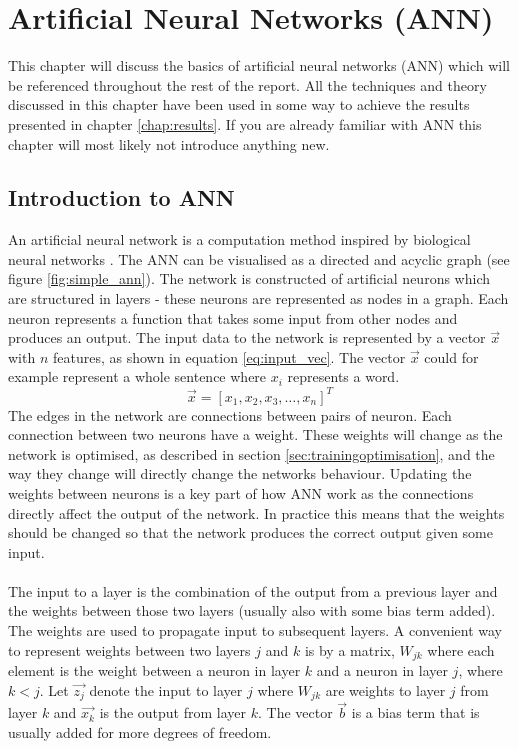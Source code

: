 \chapter{Artificial Neural Networks (ANN)}\label{chap:ann}
This chapter will discuss the basics of artificial neural networks (ANN) which will be referenced throughout the rest of the report. All the techniques and theory discussed in this chapter have been used in some way to achieve the results presented in chapter \ref{chap:results}. If you are already familiar with ANN this chapter will most likely not introduce anything new.

\section{Introduction to ANN}
An artificial neural network is a computation method inspired by biological neural networks \parencite{lippmann1987introduction}. The ANN can be visualised as a directed and acyclic graph (see figure \ref{fig:simple_ann}). The network is constructed of artificial neurons which are structured in layers - these neurons are represented as nodes in a graph. Each neuron represents a function that takes some input from other nodes and produces an output. The input data to the network is represented by a vector $\vec{x}$ with $n$ features, as shown in equation \ref{eq:input_vec}. The vector $\vec{x}$ could for example represent a whole sentence where $x_i$ represents a word.
\begin{equation}\label{eq:input_vec}
    \vec{x} = [x_1, x_2, x_3, \dots , x_n]^T
\end{equation}
The edges in the network are connections between pairs of neuron. Each connection between two neurons have a weight. These weights will change as the network is optimised, as described in section \ref{sec:trainingoptimisation}, and the way they change will directly change the networks behaviour. Updating the weights between neurons is a key part of how ANN work as the connections directly affect the output of the network. In practice this means that the weights should be changed so that the network produces the correct output given some input. 
\\\\
The input to a layer is the combination of the output from a previous layer and the weights between those two layers (usually also with some bias term added). The weights are used to propagate input to subsequent layers. A convenient way to represent weights between two layers $j$ and $k$ is by a matrix, $W_{jk}$ where each element is the weight between a neuron in layer $k$ and a neuron in layer $j$, where $k<j$. Let $\vec{z_j}$ denote the input to layer $j$ where $W_{jk}$ are weights to layer $j$ from layer $k$ and $\vec{x_k}$ is the output from layer $k$. The vector $\vec{b}$ is a bias term that is usually added for more degrees of freedom. 
